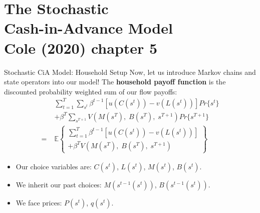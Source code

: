 \documentclass[10pt,c,aspectratio=1610,handout]{beamer}
\begin{document}
\section{The Stochastic\\Cash-in-Advance Model\\{\small Cole (2020) chapter 5}}%
\begin{frame}{Stochastic CiA Model: Household Setup}%
  Now, let us introduce Markov chains and state operators into our model! The \textbf{household payoff function} is the discounted probability weighted sum of our flow payoffs:%
  \begin{align*}%
      &\sum_{t=1}^{T} \sum_{s^t} \beta ^{t-1}  \left[ u(C(s^{t}))-v(L(s^{t}))\right] Pr\{s^t\} \\%
      & +\beta ^{T}\sum_{s^{T+1}}V(M(s^{T}),\;B(s^{T}),\;s^{T+1}) Pr\{s^{T+1}\} \\%
      = \; & \mathbb{E} \left\{%
      \begin{array}{c}%
        \sum_{t=1}^T \beta ^{t-1}\left[ u(C(s^{t}))-v(L(s^{t}))\right] \\%
        +\beta ^{T}V(M(s^{T}),\;B(s^{T}),\;s^{T+1})%
      \end{array}%
      \right\}%
    \end{align*}%
  \pause%
  \begin{itemize}%
    \item[$\blacktriangleright$] Our choice variables are: $C(s^t)$, $L(s^t)$, $M(s^t)$, $B(s^t)$.%
    \item[$\blacktriangleright$] We inherit our past choices: $M(s^{t-1}(s^t))$, $B(s^{t-1}(s^t))$.%
    \item[$\blacktriangleright$] We face prices: $P(s^t)$, $q(s^t)$.%
  \end{itemize}%
\end{frame}%
\end{document}

